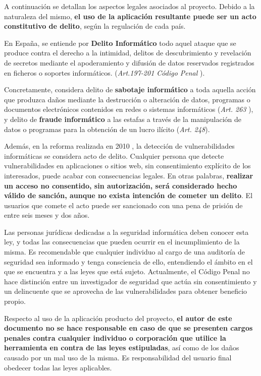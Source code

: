 A continuación se detallan los aspectos legales asociados al proyecto. Debido a la naturaleza del mismo, \textbf{el uso de la aplicación resultante puede ser un acto constitutivo de delito}, según la regulación de cada país.\sn

En España, se entiende por \textbf{Delito Informático} todo aquel ataque que se produce contra el derecho a la intimidad, delitos de descubrimiento y revelación de secretos mediante el apoderamiento y difusión de datos reservados registrados en ficheros o soportes informáticos. (\textit{Art.197-201 Código Penal} \cite{LO1995}).\sn

Concretamente, considera delito de \textbf{sabotaje informático} a toda aquella acción que produzca daños mediante la destrucción o alteración de datos, programas o documentos electrónicos contenidos en redes o sistemas informáticos (\textit{Art. 263} \cite{LO1995}), y delito de \textbf{fraude informático} a las estafas a través de la manipulación de datos o programas para la obtención de un lucro ilícito (\textit{Art. 248}\cite{LO1995}).\sn

Además, en la reforma realizada en 2010 \cite{LO2010}, la detección de vulnerabilidades informáticas se considera acto de delito. Cualquier persona que detecte vulnerabilidades en aplicaciones o sitios web, sin consentimiento explícito de los interesados, puede acabar con consecuencias legales. En otras palabras, \textbf{realizar un acceso no consentido, sin autorización, será considerado hecho válido de sanción, aunque no exista intención de cometer un delito}. El usuarios que comete el acto puede ser sancionado con una pena de prisión de entre seis meses y dos años.\sn

Las personas jurídicas dedicadas a la seguridad informática deben conocer esta ley, y todas las consecuencias que pueden ocurrir en el incumplimiento de la misma. Es recomendable que cualquier individuo al cargo de una auditoría de seguridad sea informado y tenga consciencia de ello, entendiendo el ámbito en el que se encuentra y a las leyes que está sujeto. Actualmente, el Código Penal no hace distinción entre un investigador de seguridad que actúa sin consentimiento y un delincuente que se aprovecha de las vulnerabilidades para obtener beneficio propio.\sn

Respecto al uso de la aplicación producto del proyecto, \textbf{el autor de este documento no se hace responsable en caso de que se presenten cargos penales contra cualquier individuo o corporación que utilice la herramienta en contra de las leyes estipuladas}, así como de los daños causado por un mal uso de la misma. Es responsabilidad del usuario final obedecer todas las leyes aplicables.\sn

